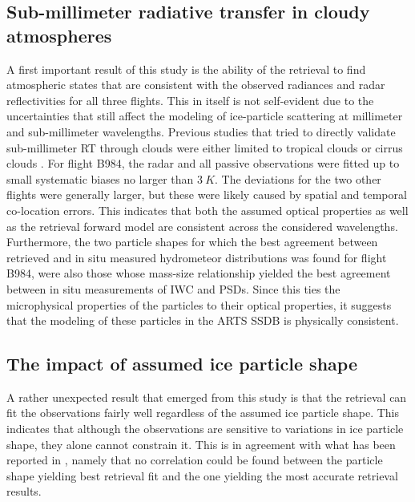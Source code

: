 \documentclass[journal abbreviation, manuscript]{copernicus}
\begin{document}
\subsection{Sub-millimeter radiative transfer in cloudy atmospheres}

 A first important result of this study is the ability of the retrieval to find
 atmospheric states that are consistent with the observed radiances and radar
 reflectivities for all three flights. This in itself is not self-evident due to
 the uncertainties that still affect the modeling of ice-particle scattering at
 millimeter and sub-millimeter wavelengths. Previous studies that tried to
 directly validate sub-millimeter RT through clouds were either limited to
 tropical clouds \citep{evans05, eriksson07} or cirrus clouds \citep{fox17}. For
 flight B984, the radar and all passive observations were fitted up to small
 systematic biases no larger than $3\ \unit{K}$. The deviations for the two
 other flights were generally larger, but these were likely caused by spatial
 and temporal co-location errors. This indicates that both the assumed optical
 properties as well as the retrieval forward model are consistent across the
 considered wavelengths. Furthermore, the two particle shapes for which the best
 agreement between retrieved and in situ measured hydrometeor distributions was
 found for flight B984, were also those whose mass-size relationship yielded the
 best agreement between in situ measurements of IWC and PSDs. Since this ties
 the microphysical properties of the particles to their optical properties, it
 suggests that the modeling of these particles in the ARTS SSDB is physically
 consistent.

\subsection{The impact of assumed ice particle shape}

A rather unexpected result that emerged from this study is that the retrieval
can fit the observations fairly well regardless of the assumed ice particle
shape. This indicates that although the observations are sensitive to variations
in ice particle shape, they alone cannot constrain it. This is in agreement with
what has been reported in \citet{pfreundschuh20}, namely that no correlation
could be found between the particle shape yielding best retrieval fit and the
one yielding the most accurate retrieval results.
\end{document}
